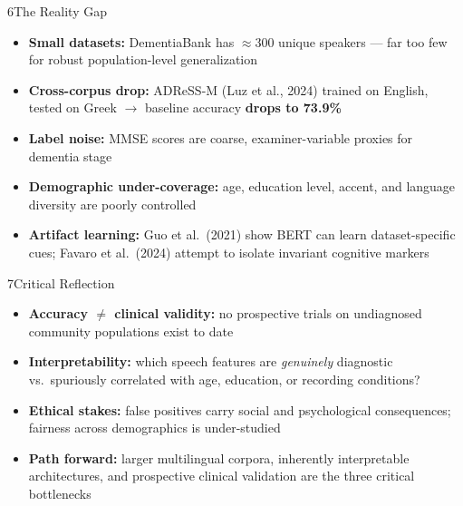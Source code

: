 \documentclass[final]{beamer}
\newlength{\rightcol}
\newlength{\blockskip}
\begin{document}
\begin{frame}[t]
\begin{columns}[T, totalwidth=\linewidth]
\begin{column}{\rightcol}
\begin{alertblock}{6\enspace The Reality Gap}
\justifying
\begin{itemize}[leftmargin=1.4em, itemsep=0.35em, topsep=0pt]
  \item \textbf{Small datasets:} DementiaBank has $\approx$300 unique
        speakers --- far too few for robust population-level generalization
  \item \textbf{Cross-corpus drop:} ADReSS-M (Luz et al., 2024) trained
        on English, tested on Greek $\rightarrow$ baseline accuracy
        \textbf{drops to 73.9\%}
  \item \textbf{Label noise:} MMSE scores are coarse, examiner-variable
        proxies for dementia stage
  \item \textbf{Demographic under-coverage:} age, education level, accent,
        and language diversity are poorly controlled
  \item \textbf{Artifact learning:} Guo et al.\ (2021) show BERT can learn
        dataset-specific cues; Favaro et al.\ (2024) attempt to isolate
        invariant cognitive markers
\end{itemize}
\end{alertblock}

\vspace{\blockskip}

\begin{exampleblock}{7\enspace Critical Reflection}
\justifying
\begin{itemize}[leftmargin=1.4em, itemsep=0.35em, topsep=0pt]
  \item \textbf{Accuracy $\neq$ clinical validity:} no prospective
        trials on undiagnosed community populations exist to date
  \item \textbf{Interpretability:} which speech features are
        \emph{genuinely} diagnostic vs.\ spuriously correlated with
        age, education, or recording conditions?
  \item \textbf{Ethical stakes:} false positives carry social and
        psychological consequences; fairness across demographics is
        under-studied
  \item \textbf{Path forward:} larger multilingual corpora, inherently
        interpretable architectures, and prospective clinical validation
        are the three critical bottlenecks
\end{itemize}
\end{exampleblock}


\end{column}
\end{columns}
\end{frame}
\end{document}
